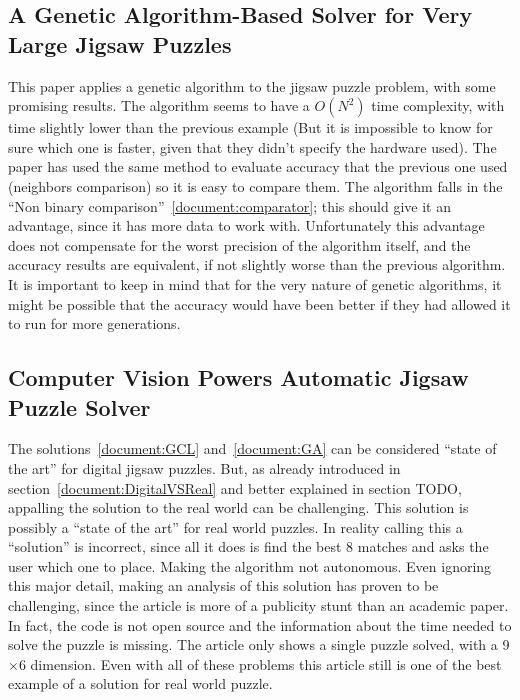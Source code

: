 \documentclass{article}
\begin{document}
\subsection{A Genetic Algorithm-Based Solver for Very Large Jigsaw Puzzles~\cite{GA}}
This paper applies a genetic algorithm to the jigsaw puzzle problem, with some promising results.\newline
The algorithm seems to have a \(O(N^2)\) time complexity, with time slightly lower than the previous example
(But it is impossible to know for sure which one is faster, given that they didn't specify the hardware used).\newline
The paper has used the same method to evaluate accuracy that the previous one used
(neighbors comparison) so it is easy to compare them.\newline
The algorithm falls in the “Non binary comparison”~\ref{document:comparator};
this should give it an advantage, since it has more data to work with.\newline
Unfortunately this advantage does not compensate for the worst precision
of the algorithm itself, and the accuracy results are equivalent,
if not slightly worse than the previous algorithm.\newline
It is important to keep in mind that for the very nature of genetic algorithms,
it might be possible that the accuracy would have been better if they had allowed
it to run for more generations.\newline
\label{document:GA}

\subsection{Computer Vision Powers Automatic Jigsaw Puzzle Solver~\cite{Abto}}
The solutions~\ref{document:GCL} and~\ref{document:GA} can be considered “state of the art” for digital jigsaw puzzles.
But, as already introduced in section~\ref{document:DigitalVSReal} and better explained in section TODO,
appalling the solution to the real world can be challenging.\newline
This solution is possibly a “state of the art” for real world puzzles.\newline
In reality calling this a “solution” is incorrect,
since all it does is find the best 8 matches and asks the user which one to place.
Making the algorithm not autonomous.\newline
Even ignoring this major detail, making an analysis of this solution has proven to be challenging,
since the article is more of a publicity stunt than an academic paper.
In fact, the code is not open source and the information about the time needed to solve the puzzle is missing.\newline
The article only shows a single puzzle solved, with a 9$\times$6 dimension.\newline
Even with all of these problems this article still is one of the best example of a solution for real world puzzle.
\end{document}
